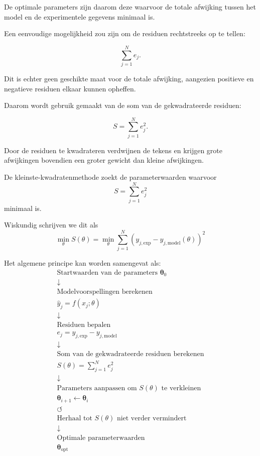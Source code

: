 \documentclass{ximera}
\begin{document}
De optimale parameters zijn daarom deze waarvoor de totale afwijking tussen het
model en de experimentele gegevens minimaal is.

Een eenvoudige mogelijkheid zou zijn om de residuen rechtstreeks op te tellen:

\[
\sum_{j=1}^{N}e_j.
\]

Dit is echter geen geschikte maat voor de totale afwijking, aangezien positieve
en negatieve residuen elkaar kunnen opheffen.

Daarom wordt gebruik gemaakt van de som van de gekwadrateerde residuen:

\[
S=\sum_{j=1}^{N}e_j^2.
\]

Door de residuen te kwadrateren verdwijnen de tekens en krijgen grote afwijkingen
bovendien een groter gewicht dan kleine afwijkingen.

\begin{conclusion} \text{ }

De kleinste-kwadratenmethode zoekt de parameterwaarden waarvoor
\[S=\sum_{j=1}^{N}e_j^2\]
minimaal is.

Wiskundig schrijven we dit als
\[\boxed{\min_{\theta}S(\theta) =
\min_{\theta} \sum_{j=1}^{N}
\left(y_{j,\mathrm{exp}} - y_{j,\mathrm{model}}(\theta)\right)^2}\]

Het algemene principe kan worden samengevat als:
\[
\begin{array}{c}
\text{Startwaarden van de parameters } \boldsymbol{\theta}_0
\\
\downarrow
\\
\text{Modelvoorspellingen berekenen}
\\
\hat{y}_j=f(x_j;\theta)
\\
\downarrow
\\
\text{Residuen bepalen}
\\
e_j=y_{j,\mathrm{exp}}-y_{j,\mathrm{model}}
\\
\downarrow
\\
\text{Som van de gekwadrateerde residuen berekenen}
\\
S(\theta)=\sum_{j=1}^{N}e_j^2
\\
\downarrow
\\
\text{Parameters aanpassen om }S(\theta)\text{ te verkleinen}
\\
\boldsymbol{\theta}_{i+1}\leftarrow\boldsymbol{\theta}_{i}
\\
\circlearrowleft
\\[-0.1cm]
\text{Herhaal tot }S(\theta)\text{ niet verder vermindert}
\\
\downarrow
\\
\text{Optimale parameterwaarden}
\\
\boldsymbol{\theta}_{\mathrm{opt}}
\end{array}
\]
\end{conclusion}
\end{document}
